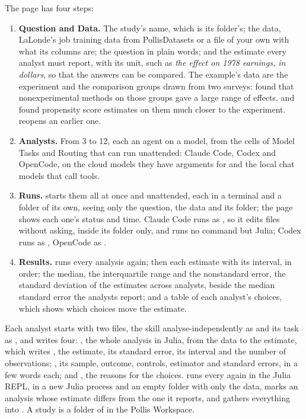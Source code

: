 The page has four steps:
\begin{enumerate}
  \item \textbf{Question and Data.} The study's name, which is its folder's; the data, LaLonde's job training data
    from PollisDatasets or a file of your own with what its columns are; the question in plain words; and the
    estimate every analyst must report, with its unit, such as \emph{the effect on 1978 earnings, in dollars}, so
    that the answers can be compared. The example's data are the experiment and the comparison groups drawn from
    two surveys:  found that nonexperimental methods on those groups gave a large
    range of effects, and  found propensity score estimates on them much
    closer to the experiment.  reopens an earlier one.
  \item \textbf{Analysts.} From 3 to 12, each an agent on a model, from the cells of Model Tasks and Routing that
    can run unattended: Claude Code, Codex and OpenCode, on the cloud models they have arguments for and the local
    chat models that call tools.
  \item \textbf{Runs.}  starts them all at once and unattended, each in a terminal and a
    folder of its own, seeing only the question, the data and its folder; the page shows each one's status and
    time. Claude Code runs as , so it
    edits files without asking, inside its folder only, and runs no command but Julia; Codex runs as
    , OpenCode as .
  \item \textbf{Results.}  runs every analysis again; then each estimate with its interval,
    in order; the median, the interquartile range and the nonstandard error, the standard deviation of the
    estimates across analysts, beside the median standard error the analysts report; and a table of each analyst's
    choices, which shows which choices move the estimate.
\end{enumerate}
Each analyst starts with two files, the skill analyse-independently as  and its task as
, and writes four: , the whole analysis in Julia, from the data to the estimate,
which writes , the estimate, its standard error, its interval and the number of observations;
, its sample, outcome, controls, estimator and standard errors, in a few words each; and
, the reasons for the choices.  runs every  again in the
Julia REPL, in a new Julia process and an empty folder with only the data, marks an analysis whose estimate differs
from the one it reports, and gathers everything into . A study is a folder of
 in the Pollis Workspace.

